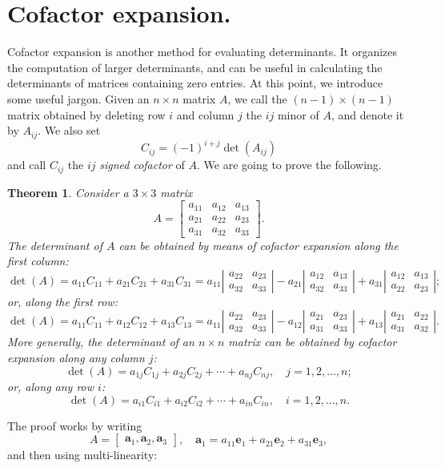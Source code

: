\documentclass[12pt]{article}
\newcommand{\ba}{\mathbf{a}}
\newcommand{\be}{\mathbf{e}}
\newcommand{\bmat}[1]{\begin{bmatrix}#1\end{bmatrix}}
\newcommand{\vmat}[1]{\left|\begin{matrix}#1\end{matrix}\right|}
\newtheorem{theorem}{Theorem}
\begin{document}
\section{Cofactor expansion.}
Cofactor expansion is another method for evaluating determinants.  It
organizes the computation of larger determinants, and can be useful in
calculating the determinants of matrices containing zero entries.  
At this point, we introduce some useful jargon.  Given an $n\times n$
matrix $A$, we call the $(n-1)\times(n-1)$ matrix obtained by deleting
row $i$ and column $j$ the $ij$ minor of $A$, and denote it by
$A_{ij}$.  We also set
\[ C_{ij} = (-1)^{i+j} \det(A_{ij}) \] and call $C_{ij}$ the $ij$
\emph{signed cofactor} of $A$.  
We are going to prove the following.
\begin{theorem}
  Consider a $3\times 3$ matrix
  \[ A = \bmat{a_{11} & a_{12} & a_{13} \\ a_{21} & a_{22} & a_{23} \\
    a_{31} & a_{32} & a_{33} }.\] The determinant of $A$ can be
  obtained by means of cofactor expansion along the first column:
  \[ \det(A) = a_{11} C_{11} + a_{21} C_{21} + a_{31} C_{31}  = a_{11} \vmat{ a_{22} & a_{23} \\ a_{32} & a_{33}}
  - a_{21} \vmat{a_{12} & a_{13} \\ a_{32} & a_{33}} 
  + a_{31} \vmat{a_{12} & a_{13} \\ a_{22} &a_{23}};\]
  or, along the first row:
  \[ \det(A) = a_{11} C_{11} + a_{12} C_{12} + a_{13} C_{13}  = a_{11} \vmat{ a_{22} & a_{23} \\ a_{32} & a_{33}}
  - a_{12} \vmat{a_{21} & a_{23} \\ a_{31} & a_{33}} 
  + a_{13} \vmat{a_{21} & a_{22} \\ a_{31} &a_{32}}.\]
  More generally, the determinant of an $n\times n$ matrix can be
  obtained by cofactor expansion along  any column $j$:
  \[ \det(A) = a_{1j} C_{1j} + a_{2j} C_{2j} + \cdots + a_{nj}
  C_{nj},\quad j=1,2,\ldots,n;\]
  or, along any  row $i$:
  \[ \det(A) = a_{i1} C_{i1} + a_{i2} C_{i2} +\cdots +  a_{in}
  C_{in},\quad i=1,2,\ldots,n.\]
\end{theorem}
\noindent
The proof works by writing 
\[ A = \bmat{\ba_1, \ba_2, \ba_3},\quad \ba_1 = a_{11} \be_1+ a_{21}
\be_2 + a_{31} \be_3,\] and then using multi-linearity:
\end{document}
